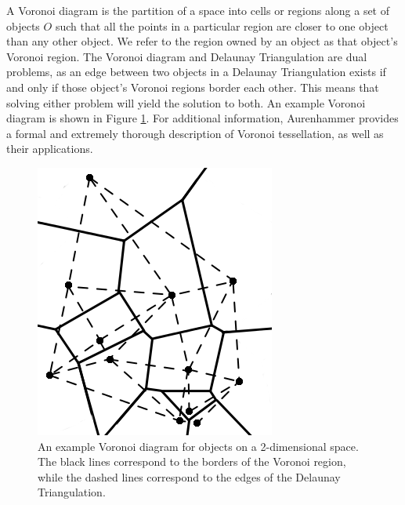 \documentclass[11pt, conference, letterpaper]{IEEEtran}
\begin{document}
A Voronoi diagram is the partition of a space into cells or regions along a set of objects $O$ such that all the points in a particular region are closer to one object than any other object.  
We refer to the region owned by an object as that object's Voronoi region.
The Voronoi diagram and Delaunay Triangulation are dual problems, as an edge between two objects in a Delaunay Triangulation exists if and only if those object's Voronoi regions border each other.  
This means that solving either problem will yield the solution to both.   
An example Voronoi diagram is shown in Figure \ref{voro-ex}.
For additional information, Aurenhammer \cite{aurenhammer1991voronoi} provides a formal and extremely thorough description of Voronoi tessellation, as well as their applications.


\begin{figure}
	\centering
	\includegraphics[width=0.75\linewidth]{voronoi}
	\caption{An example Voronoi diagram for objects on a 2-dimensional space.  The black lines correspond to the borders of the Voronoi region, while the dashed lines correspond to the edges of the Delaunay Triangulation.}
	\label{voro-ex}
\end{figure}
\end{document}
